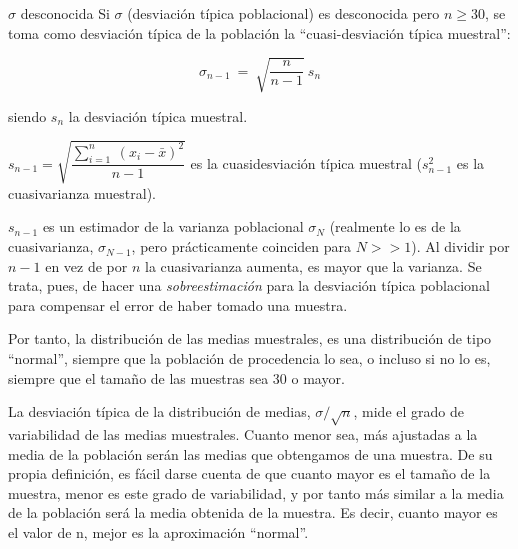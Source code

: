 \vspace{4mm}%

\begin{myalertblock}{$\sigma$ desconocida}
	Si $\sigma$ (desviación típica poblacional) es desconocida pero $n\ge 30$, se toma como desviación típica de la población la ``cuasi-desviación típica muestral'':

$$ \sigma_{n-1} \ = \ \sqrt{\dfrac{n}{n-1}}\ s_n$$

siendo $s_n$ la desviación típica muestral.	

\vspace{4mm} \textcolor{gris}{\begin{footnotesize} $s_{n-1}=\sqrt{\dfrac{\displaystyle  \sum_{i=1}^n\ (x_i-\bar x)^2}{n-1}}$ es la cuasidesviación típica muestral ($s^2_{n-1}$ es la cuasivarianza muestral). \end{footnotesize}}

\vspace{2mm}  $s_{n-1}$ es un estimador de la varianza poblacional $\sigma_N$ (realmente lo es de la cuasivarianza, $\sigma_{N-1}$, pero prácticamente coinciden para $N>>1$). Al dividir por $n-1$ en vez de por $n$ la cuasivarianza aumenta, es mayor que la varianza. Se trata, pues, de hacer una \emph{sobreestimación} para la desviación típica poblacional para compensar el error de haber tomado una muestra.
\end{myalertblock}

Por tanto, la distribución de las medias muestrales, es una distribución de tipo ``normal'', siempre que la población de procedencia lo sea, o incluso si no lo es, siempre que el tamaño de las muestras sea 30 o mayor.

\vspace{2mm} La desviación típica de la distribución de medias, $\sigma/\sqrt{n}$, mide el grado de variabilidad de las medias muestrales. Cuanto menor sea, más ajustadas a la media de la población serán las medias que obtengamos de una muestra. De su propia definición, es fácil darse cuenta de que cuanto mayor es el tamaño de la muestra, menor es este grado de variabilidad, y por tanto más similar a la media de la población será la media obtenida de la muestra. Es decir, cuanto mayor es el valor de n, mejor es la aproximación ``normal''.

